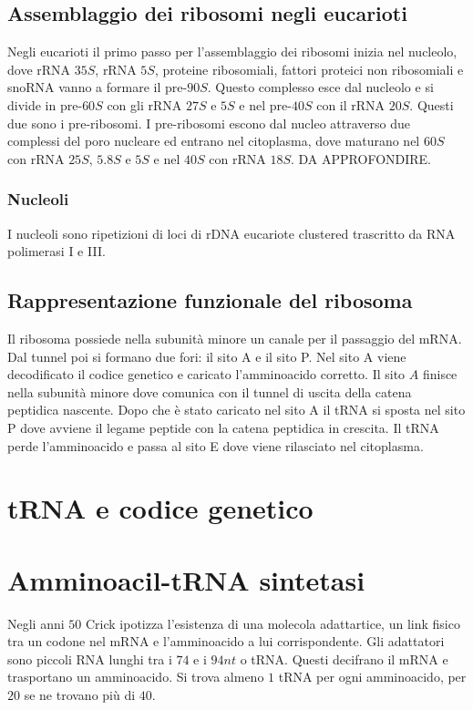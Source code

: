 \subsection{Assemblaggio dei ribosomi negli eucarioti}
Negli eucarioti il primo passo per l'assemblaggio dei ribosomi inizia nel nucleolo, dove rRNA $35S$, rRNA $5S$, proteine ribosomiali, fattori proteici non ribosomiali e snoRNA vanno a formare il pre-$90S$.
Questo complesso esce dal nucleolo e si divide in pre-$60S$ con gli rRNA $27S$ e $5S$ e nel pre-$40S$ con il rRNA $20S$. Questi due sono i pre-ribosomi. I pre-ribosomi escono dal nucleo attraverso due 
complessi del poro nucleare ed entrano nel citoplasma, dove maturano nel $60S$ con rRNA $25S$, $5.8S$ e $5S$ e nel $40S$ con rRNA $18S$. DA APPROFONDIRE.
\subsubsection{Nucleoli}
I nucleoli sono ripetizioni di loci di rDNA eucariote clustered trascritto da RNA polimerasi I e III.
\subsection{Rappresentazione funzionale del ribosoma}
Il ribosoma possiede nella subunit\`a minore un canale per il passaggio del mRNA. Dal tunnel poi si formano due fori: il sito A e il sito P. Nel sito A viene decodificato il codice genetico e caricato 
l'amminoacido corretto. Il sito $A$ finisce nella subunit\`a minore dove comunica con il tunnel di uscita della catena peptidica nascente. Dopo che \`e stato caricato nel sito A il tRNA si sposta 
nel sito P dove avviene il legame peptide con la catena peptidica in crescita. Il tRNA perde l'amminoacido e passa al sito E dove viene rilasciato nel citoplasma. 
\section{tRNA e codice genetico}

\section{Amminoacil-tRNA sintetasi}
Negli anni $50$ Crick ipotizza l'esistenza di una molecola adattartice, un link fisico tra un codone nel mRNA e l'amminoacido a lui corrispondente. Gli adattatori sono piccoli RNA lunghi tra i $74$ e i 
$94nt$ o tRNA. Questi decifrano il mRNA e trasportano un amminoacido. Si trova almeno $1$ tRNA per ogni amminoacido, per $20$ se ne trovano pi\`u di $40$. 
